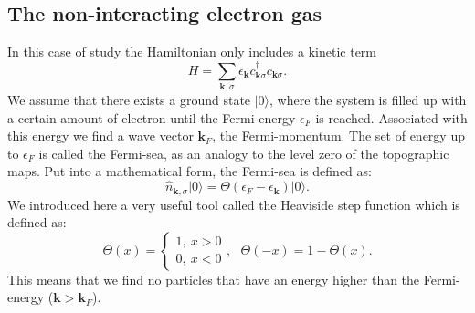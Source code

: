 \documentclass[../main.tex]{subfile}
\begin{document}
\subsection{The non-interacting electron gas}
In this case of study the Hamiltonian only includes a kinetic term
\begin{equation}\label{eq:NonInteractingHamiltonian}
    H=\sum_{\bm{k},\sigma} \epsilon_{\bm{k}} c_{\bm{k}\sigma}^{\dagger}c_{\bm{k}\sigma}.
\end{equation}
We assume that there exists a ground state $|0\rangle$, where the system is filled up with a certain amount of electron until the Fermi-energy $\epsilon_F$ is reached. Associated with this
energy we find a wave vector $\bm{k}_F$, the Fermi-momentum. The set of energy up to $\epsilon_F$ is called the Fermi-sea, as an analogy to the level zero of the topographic maps. 
Put into a mathematical form, the Fermi-sea is defined as:
\begin{equation}
    \hat{n}_{\bm{k},\sigma} |0\rangle = \Theta(\epsilon_F - \epsilon_{\bm{k}})|0\rangle.\label{eq:MomentumDistributionFree}
\end{equation}
We introduced here a very useful tool called the Heaviside step function which is defined as: 
\begin{equation}\label{eq:Heaviside}
    \Theta(x) = \begin{cases}
        1, ~x > 0\\
        0, ~x < 0
    \end{cases} , ~~~ \Theta(-x) = 1 - \Theta(x).
\end{equation}
This means that we find no particles that have an energy higher than the Fermi-energy ($\bm{k}>\bm{k}_F$).\\
\end{document}
